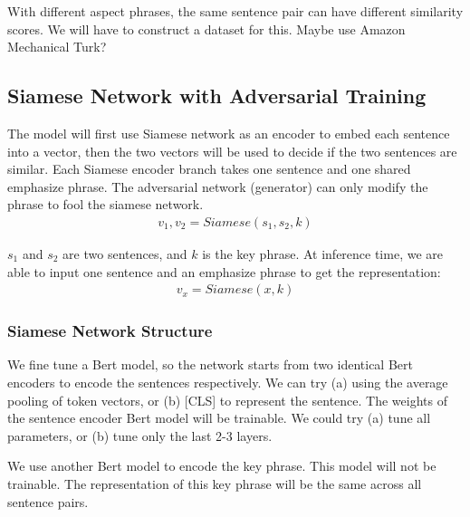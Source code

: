\documentclass[letterpaper]{article}
\begin{document}
With different aspect phrases, the same sentence pair can have different similarity scores. We will have to construct a dataset for this. Maybe use Amazon Mechanical Turk?

\subsection{Siamese Network with Adversarial Training}
The model will first use Siamese network as an encoder to embed each sentence into a vector, then the two vectors will be used to decide if the two sentences are similar. Each Siamese encoder branch takes one sentence and one shared emphasize phrase. The adversarial network (generator) can only modify the phrase to fool the siamese network.
\begin{align}
v_1, v_2 = Siamese(s_1, s_2, k)
\end{align}

$s_1$ and $s_2$ are two sentences, and $k$ is the key phrase. At inference time, we are able to input one sentence and an emphasize phrase to get the representation:
\begin{align}
v_x = Siamese(x, k)
\end{align}



\subsubsection{Siamese Network Structure}

We fine tune a Bert model, so the network starts from two identical Bert encoders to encode the sentences respectively. We can try (a) using the average pooling of token vectors, or (b) [CLS] to represent the sentence. The weights of the sentence encoder Bert model will be trainable. We could try (a) tune all parameters, or (b) tune only the last 2-3 layers. 

We use another Bert model to encode the key phrase. This model will not be trainable. The representation of this key phrase will be the same across all sentence pairs.
\end{document}
